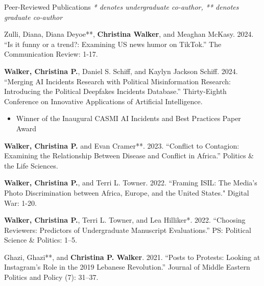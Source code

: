 \documentclass{resume} %
\begin{document}
\begin{rSection}{Peer-Reviewed Publications} \textit{* denotes undergraduate co-author, ** denotes graduate co-author}

Zulli, Diana, Diana Deyoe**, \textbf{Christina Walker}, and Meaghan McKasy. 2024. “Is it funny or a trend?: Examining US news humor on TikTok.” The Communication Review: 1-17. \href{https://doi.org/10.1080/10714421.2024.2359802}{ }


\textbf{Walker, Christina P.}, Daniel S. Schiff, and Kaylyn Jackson Schiff. 2024. “Merging AI Incidents Research with Political Misinformation Research: Introducing the Political Deepfakes Incidents Database.” Thirty-Eighth Conference on Innovative Applications of Artificial Intelligence. \href{https://ojs.aaai.org/index.php/AAAI/article/view/30349/32389}{ }

\begin{itemize}
    \item Winner of the Inaugural CASMI AI Incidents and Best Practices Paper Award
\end{itemize}

\textbf{Walker, Christina P.} and Evan Cramer**. 2023. “Conflict  to Contagion: Examining the Relationship Between Disease and Conflict in Africa.”  Politics \& the Life Sciences. \href{https://www.cambridge.org/core/services/aop-cambridge-core/content/view/BC1388BEDE0C769F1AABDA8C2C4DC2C5/S0730938423000278a.pdf/contagion_to_unrest_investigating_the_link_between_disease_and_civil_unrest_in_africa.pdf}{ }

\textbf{Walker, Christina P.}, and Terri L. Towner. 2022. ``Framing ISIL: The Media's Photo Discrimination between Africa, Europe, and the United States." Digital War: 1-20. 
\href{https://link.springer.com/article/10.1057/s42984-022-00044-7}{}  

\textbf{Walker, Christina P.}, Terri L. Towner, and Lea Hilliker*. 2022. “Choosing Reviewers: Predictors of Undergraduate Manuscript Evaluations.” PS: Political Science \& Politics: 1–5. 
\href{https://www.cambridge.org/core/journals/ps-political-science-and-politics/article/choosing-reviewers-predictors-of-undergraduate-manuscript-evaluations/AE52D3F5932D2FACDA39DB3212522D45}{ }

Ghazi, Ghazi**, and \textbf{Christina P. Walker}. 2021. “Posts to Protests: Looking at Instagram’s Role in the 2019 Lebanese Revolution.” Journal of Middle Eastern Politics and Policy (7): 31–37. \href{https://www.researchgate.net/profile/Christina-Walker-5/publication/361944213_Spring_2021_Posts_to_Protests_Looking_at_Instagram's_Role_in_the_2019_Lebanese_Revolution/links/62cdd11e6151ad090b960b72/Spring-2021-Posts-to-Protests-Looking-at-Instagrams-Role-in-the-2019-Lebanese-Revolution.pdf}{}


\end{rSection}
\end{document}
